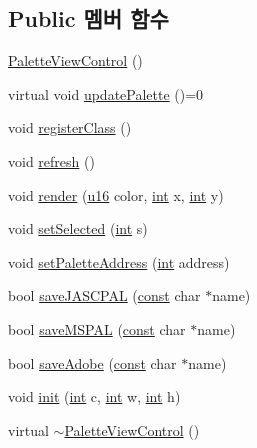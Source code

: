 \subsection*{Public 멤버 함수}
\begin{DoxyCompactItemize}
\item 
\mbox{\hyperlink{class_palette_view_control_ae7bc315eab0f7925e3c45b063244098b}{Palette\+View\+Control}} ()
\item 
virtual void \mbox{\hyperlink{class_palette_view_control_a12772d59f8e890a920cb200d2f6a4b7a}{update\+Palette}} ()=0
\item 
void \mbox{\hyperlink{class_palette_view_control_add54d86e21f3acfcdc129dd656109c83}{register\+Class}} ()
\item 
void \mbox{\hyperlink{class_palette_view_control_aace3ab97afe8216b3873159ee852779f}{refresh}} ()
\item 
void \mbox{\hyperlink{class_palette_view_control_adbcdd372f28027690355099e14b669d1}{render}} (\mbox{\hyperlink{_system_8h_a9e6c91d77e24643b888dbd1a1a590054}{u16}} color, \mbox{\hyperlink{_util_8cpp_a0ef32aa8672df19503a49fab2d0c8071}{int}} x, \mbox{\hyperlink{_util_8cpp_a0ef32aa8672df19503a49fab2d0c8071}{int}} y)
\item 
void \mbox{\hyperlink{class_palette_view_control_afe3570f3d0bf905f25977346a50dec7f}{set\+Selected}} (\mbox{\hyperlink{_util_8cpp_a0ef32aa8672df19503a49fab2d0c8071}{int}} s)
\item 
void \mbox{\hyperlink{class_palette_view_control_af552330a1e761f659936d3dd628f9a81}{set\+Palette\+Address}} (\mbox{\hyperlink{_util_8cpp_a0ef32aa8672df19503a49fab2d0c8071}{int}} address)
\item 
bool \mbox{\hyperlink{class_palette_view_control_a9efcff77eaf476013ac5f3ebd2d53779}{save\+J\+A\+S\+C\+P\+AL}} (\mbox{\hyperlink{getopt1_8c_a2c212835823e3c54a8ab6d95c652660e}{const}} char $\ast$name)
\item 
bool \mbox{\hyperlink{class_palette_view_control_a0e2249bb157bf7fb36b128a83bf108b5}{save\+M\+S\+P\+AL}} (\mbox{\hyperlink{getopt1_8c_a2c212835823e3c54a8ab6d95c652660e}{const}} char $\ast$name)
\item 
bool \mbox{\hyperlink{class_palette_view_control_a14d553a87d89463719adcaa63f42a72b}{save\+Adobe}} (\mbox{\hyperlink{getopt1_8c_a2c212835823e3c54a8ab6d95c652660e}{const}} char $\ast$name)
\item 
void \mbox{\hyperlink{class_palette_view_control_abc7a9dd832f6b5fc8ca81c8b08bd2ee8}{init}} (\mbox{\hyperlink{_util_8cpp_a0ef32aa8672df19503a49fab2d0c8071}{int}} c, \mbox{\hyperlink{_util_8cpp_a0ef32aa8672df19503a49fab2d0c8071}{int}} w, \mbox{\hyperlink{_util_8cpp_a0ef32aa8672df19503a49fab2d0c8071}{int}} h)
\item 
virtual \mbox{\hyperlink{class_palette_view_control_ab09935586912db770ff77aa433be4d84}{$\sim$\+Palette\+View\+Control}} ()
\end{DoxyCompactItemize}
